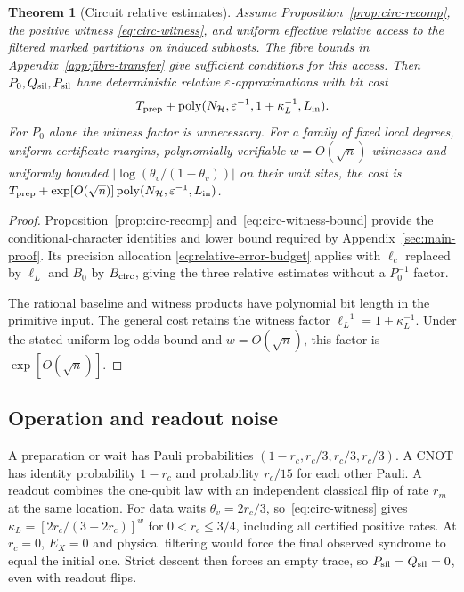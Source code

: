 \documentclass[10pt,twocolumn]{article}
\newtheorem{theorem}{Theorem}
\theoremstyle{definition}
\DeclareMathOperator{\poly}{poly}
\newcommand{\Lin}{L_{\mathrm{in}}}
\begin{document}
\begin{theorem}[Circuit relative estimates]\label{thm:circ-relative}
Assume Proposition~\ref{prop:circ-recomp}, the positive witness
\eqref{eq:circ-witness}, and uniform effective relative access to the
filtered marked partitions on induced subhosts. The fibre bounds in Appendix~\ref{app:fibre-transfer}
give sufficient conditions for this access. Then $P_0,Q_{\rm sil},P_{\rm sil}$ have deterministic
relative $\varepsilon$-approximations with bit cost
\begin{equation}\label{eq:circ-relative-cost}
 T_{\rm prep}+\poly(N_{\mathcal H},\varepsilon^{-1},
                                  1+\kappa_L^{-1},\Lin).
\end{equation}
For $P_0$ alone the witness factor is unnecessary. For a family of fixed
local degrees, uniform certificate margins, polynomially verifiable
$w=O(\sqrt n)$ witnesses and uniformly bounded
$|\log(\theta_v/(1-\theta_v))|$ on their wait sites, the cost is
$T_{\rm prep}+\exp[O(\sqrt n)]\poly(N_{\mathcal H},\varepsilon^{-1},\Lin)$.
\end{theorem}
\begin{proof}
Proposition~\ref{prop:circ-recomp} and~\eqref{eq:circ-witness-bound}
provide the conditional-character identities and lower bound required
by Appendix~\ref{sec:main-proof}. Its precision allocation
\eqref{eq:relative-error-budget} applies with $\ell_c$ replaced by
$\ell_L$ and $B_0$ by $B_{\rm circ}$, giving the three relative
estimates without a $P_0^{-1}$ factor.

The rational baseline and witness products have polynomial bit
length in the primitive input. The general cost retains the witness
factor $\ell_L^{-1}=1+\kappa_L^{-1}$. Under the stated uniform
log-odds bound and $w=O(\sqrt n)$, this factor is $\exp[O(\sqrt n)]$.
\end{proof}

\subsection{Operation and readout noise}
A preparation or wait has Pauli probabilities $(1-r_c,r_c/3,r_c/3,r_c/3)$.
A CNOT has identity probability $1-r_c$ and probability $r_c/15$ for
each other Pauli. A readout combines the one-qubit law with an
independent classical flip of rate $r_m$ at the same location.
For data waits $\theta_v=2r_c/3$, so~\eqref{eq:circ-witness} gives
$\kappa_L=[2r_c/(3-2r_c)]^w$ for $0<r_c\le3/4$, including all
certified positive rates.
At $r_c=0$, $E_X=0$ and physical filtering would force the final observed
syndrome to equal the initial one. Strict descent then forces an empty
trace, so $P_{\rm sil}=Q_{\rm sil}=0$, even with readout flips.
\end{document}
